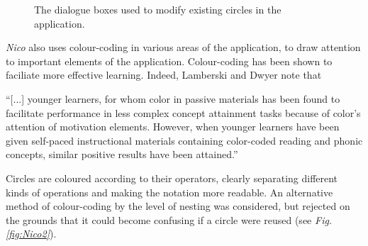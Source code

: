 \documentclass[12pt,twoside,notitlepage,xetex]{report}
\begin{document}
\begin{center}
\begin{figure}[H]
\begin{center}
\end{center}
\caption{The dialogue boxes used to modify existing circles in the application.}
\label{fig:Dialogues}
\end{figure}
\end{center}

\emph{Nico} also uses colour-coding in various areas of the application, to
draw attention to important elements of the application.  Colour-coding has
been shown to faciliate more effective learning.  Indeed, Lamberski and Dwyer
note that
\begin{center}
\parbox[c]{\textwidth-2cm}{
\small
``[...] younger learners, for whom color in passive materials has been found to facilitate performance in less complex concept attainment tasks because of color's attention of motivation elements.  However, when younger learners have been given self-paced instructional materials containing color-coded reading and phonic concepts, similar positive results have been attained.'' \cite{Lamberski1983}
}
\end{center}
Circles are coloured according to their operators, clearly separating different
kinds of operations and making the notation more readable.  An alternative
method of colour-coding by the level of nesting was considered, but rejected on
the grounds that it could become confusing if a circle were reused (see
\emph{Fig. \ref{fig:Nico2}}).
\end{document}
